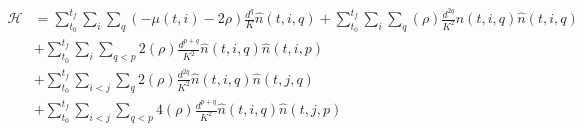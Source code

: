 \documentclass[12pt]{article}
\begin{document}
\begin{align}
\mathcal{H} &= \sum_{t_0}^{t_f} \sum_i \sum_q (-\mu(t,i) - 2\rho) \frac{d^q}{K} \hat{n}(t,i,q) 
+  \sum_{t_0}^{t_f} \sum_{i} \sum_{q}  (\rho)\frac{d^{2q}}{K^2} \hat{n}(t,i,q)\hat{n}(t,i,q) \nonumber\\
&+  \sum_{t_0}^{t_f} \sum_{i} \sum_{q<p} 2 (\rho)\frac{d^{p+q}}{K^2} \hat{n}(t,i,q)\hat{n}(t,i,p) \nonumber\\
&+  \sum_{t_0}^{t_f} \sum_{i<j} \sum_{q} 2 (\rho)\frac{d^{2q}}{K^2} \hat{n}(t,i,q)\hat{n}(t,j,q) \nonumber\\
&+  \sum_{t_0}^{t_f} \sum_{i<j} \sum_{q<p} 4(\rho)\frac{d^{p+q}}{K^2} \hat{n}(t,i,q)\hat{n}(t,j,p) \nonumber\\
\end{align}
\end{document}
